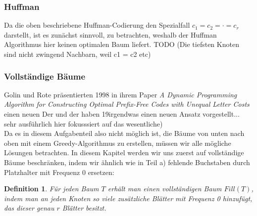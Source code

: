 \documentclass[a4paper,10pt,ngerman]{scrartcl}
\newtheorem{definition}[satz]{Definition}
\begin{document}
    \subsubsection{Huffman}
    Da die oben beschriebene Huffman-Codierung den Spezialfall $c_1 = c_2 = \cdot = c_r$ darstellt, ist es zunächst sinnvoll, zu betrachten, weshalb der Huffman Algorithmus hier keinen optimalen Baum liefert.
    TODO (Die tiefsten Knoten sind nicht zwingend Nachbarn, weil c1 = c2 etc)

    \subsubsection{Vollständige Bäume}
    Golin und Rote präsentierten 1998 in ihrem Paper \textit{A Dynamic Programming Algorithm for Constructing
        Optimal Prefix-Free Codes with Unequal Letter Costs} \cite{golin_dynamic_1998} einen neuen Der und der haben 19irgendwas einen neuen Ansatz vorgestellt... sehr ausführlich hier fokusssiert auf das wesentliche) \\
    Da es in diesem Aufgabenteil also nicht möglich ist, die Bäume von unten nach oben mit einem Greedy-Algorithmus zu erstellen, müssen wir alle mögliche Lösungen betrachten.
    In diesem Kapitel werden wir uns zuerst auf vollständige Bäume beschränken, indem wir ähnlich wie in Teil a) fehlende Buchstaben durch Platzhalter mit Frequenz 0 ersetzen:
    \begin{definition}
        Für jeden Baum $T$ erhält man einen vollständigen Baum $Fill(T)$, indem man an jeden Knoten so viele zusätzliche Blätter mit Frequenz 0 hinzufügt, das dieser genau $r$ Blätter besitzt.
    \end{definition}
\end{document}
